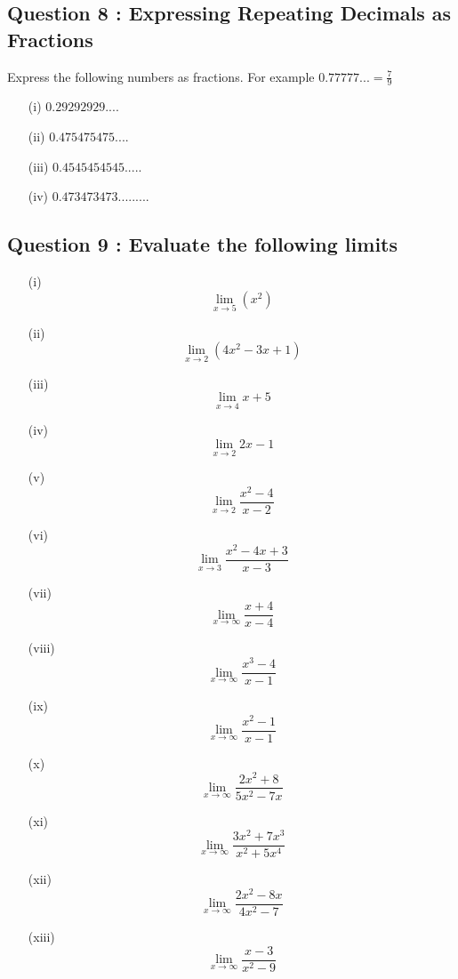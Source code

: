 \documentclass[]{article}
\begin{document}
\subsection*{Question 8 : Expressing Repeating Decimals as Fractions}
Express the following numbers as fractions. For example $ 0.77777... = \frac{7}{9}$

\begin{multicols}{2}
	\begin{itemize}
		\item[(i)] $0.29292929....$
		\item[(ii)] $0.475475475....$
		
		\item[(iii)] $0.4545454545.....$
		\item[(iv)] $0.473473473.........$
	\end{itemize} 
\end{multicols}

\newpage

\subsection*{Question 9 : Evaluate the following limits}

\begin{multicols}{2}
	\begin{itemize}
		\item[(i)] \[ \lim_{x\to 5} (x^2)\]
		
		\item[(ii)] \[ \lim_{x\to 2} (4x^2 - 3x+1)\]
		
		
		\item[(iii)]\[\lim_{x \to 4 } x  + 5 \]
		\item[(iv)]\[\lim_{x \to 2 } 2x  - 1 \]
		\item[(v)]\[\lim_{x \to 2 } \frac{x^2-4}{x-2}\]
		\item[(vi)]\[\lim_{x \to 3 } \frac{x^2-4x +3}{x-3}\]
		
		\item[(vii)]\[\lim_{x \to \infty } \frac{x+4}{x-4}\]
		\item[(viii)]\[\lim_{x \to \infty } \frac{x^3-4}{x-1}\]
		\item[(ix)] \[\lim_{x \to \infty } \frac{x^2-1}{x-1} \]
		
		\item[(x)] \[ \lim_{x \to \infty} \frac{2x^2 +8}{5x^2 - 7x} \] 
		
		\item[(xi)]\[ \lim_{x \to \infty} \frac{3x^2 +7x^3}{x^2 +5x^4} \] 
		
		\item[(xii)] \[ \lim_{x \to \infty} \frac{2x^2 - 8x }{4x^2 - 7} \]
		
		
		\item[(xiii)] \[ \lim_{x \to \infty} \frac{x-3}{x^2 - 9} \]
	\end{itemize}
\end{multicols}
\end{document}
